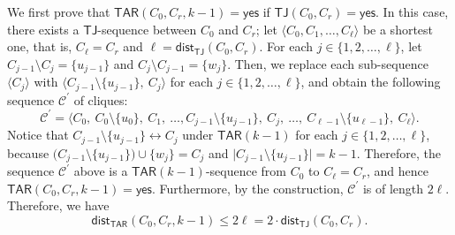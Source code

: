 \documentclass{llncs}
\newcommand{\onestep}{\leftrightarrow}
\newcommand{\TAR}[1]{\mathsf{TAR}(#1)}
\newcommand{\TJ}{\mathsf{TJ}}
\newcommand{\ini}{0}
\newcommand{\tar}{r}
\newcommand{\cliq}{C}
\newcommand{\YES}{\mathsf{yes}}
\newcommand{\TARins}[3]{\mathsf{TAR}(#1,#2,#3)}
\newcommand{\TJins}[2]{\mathsf{TJ}(#1,#2)}
\newcommand{\distTAR}[3]{\mathsf{dist_{TAR}}(#1,#2,#3)}
\newcommand{\distTJ}[2]{\mathsf{dist_{TJ}}(#1,#2)}
\newcounter{one}
\begin{document}
We first prove that $\TARins{\cliq_{\ini}}{\cliq_{\tar}}{k-1} = \YES$ if $\TJins{\cliq_{\ini}}{\cliq_{\tar}} = \YES$.
	In this case, there exists a $\TJ$-sequence between $\cliq_{\ini}$ and $\cliq_{\tar}$; 
let $\langle \cliq_{0}, \cliq_{1}, \dots, \cliq_{\ell} \rangle$ be a shortest one, that is, $\cliq_{\ell} = \cliq_{\tar}$ and $\ell = \distTJ{\cliq_{\ini}}{\cliq_{\tar}}$.
	For each $j \in \{1,2, \ldots, \ell\}$, let $\cliq_{j-1} \setminus \cliq_{j} = \{ u_{j-1} \}$ and $\cliq_{j} \setminus \cliq_{j-1} = \{ w_j\}$. 
	Then, we replace each sub-sequence $\langle \cliq_j \rangle$ with $\langle \cliq_{j-1} \setminus \{ u_{j-1} \},\ \cliq_j \rangle$ for each $j \in \{1,2, \ldots, \ell\}$, and obtain the following sequence $\mathcal{C}^\prime$ of cliques:
	\[
		\mathcal{C}^\prime = \langle \cliq_0,\ \cliq_0 \setminus \{u_0 \},\ \cliq_1,\ \ldots, \cliq_{j-1} \setminus \{ u_{j-1} \},\ \cliq_{j},\ \ldots,\ \cliq_{\ell-1} \setminus \{ u_{\ell-1} \},\ \cliq_{\ell} \rangle.   
	\]
	Notice that $\cliq_{j-1} \setminus \{ u_{j-1} \} \onestep \cliq_{j}$ under $\TAR{k-1}$ for each $j \in \{1,2, \ldots, \ell\}$, because $\bigl( \cliq_{j-1} \setminus \{ u_{j-1} \} \bigr) \cup \{ w_j\} = \cliq_j$ and $\bigl|\cliq_{j-1} \setminus \{ u_{j-1} \} \bigr| = k-1$.
	Therefore, the sequence $\mathcal{C}^\prime$ above is a $\TAR{k-1}$-sequence from $\cliq_{\ini}$ to $\cliq_{\ell} = \cliq_{\tar}$, and hence $\TARins{\cliq_{\ini}}{\cliq_{\tar}}{k-1} = \YES$. 
	Furthermore, by the construction, $\mathcal{C}^\prime$ is of length $2\ell$.
	Therefore, we have 
	\begin{equation} \label{eq:TAR<=2TJ}
		\distTAR{\cliq_{\ini}}{\cliq_{\tar}}{k-1} \le 2 \ell = 2 \cdot \distTJ{\cliq_{\ini}}{\cliq_{\tar}}.
	\end{equation}
	
\end{document}
